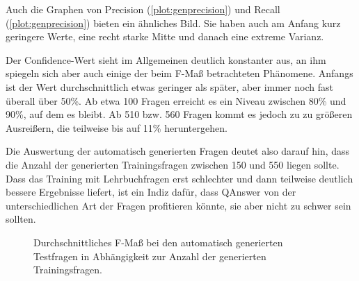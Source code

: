 Auch die Graphen von Precision (\cref{plot:genprecision}) und Recall (\cref{plot:genprecision}) bieten ein ähnliches Bild.
Sie haben auch am Anfang kurz geringere Werte, eine recht starke Mitte und danach eine extreme Varianz.

Der Confidence-Wert sieht im Allgemeinen deutlich konstanter aus, an ihm spiegeln sich aber auch einige der beim F-Maß betrachteten Phänomene.
Anfangs ist der Wert durchschnittlich etwas geringer als später, aber immer noch fast überall über 50\%.
Ab etwa 100 Fragen erreicht es ein Niveau zwischen 80\% und 90\%, auf dem es bleibt.
Ab 510 bzw. 560 Fragen kommt es jedoch zu zu größeren Ausreißern, die teilweise bis auf 11\% heruntergehen.

Die Auswertung der automatisch generierten Fragen deutet also darauf hin, dass die Anzahl der generierten Trainingsfragen zwischen 150 und 550 liegen sollte.
Dass das Training mit Lehrbuchfragen erst schlechter und dann teilweise deutlich bessere Ergebnisse liefert, ist ein Indiz dafür,
dass QAnswer von der unterschiedlichen Art der Fragen profitieren könnte, sie aber nicht zu schwer sein sollten.

\begin{figure}%
  \begin{center}
    \caption{Durchschnittliches F-Maß bei den automatisch generierten Testfragen in Abhängigkeit zur Anzahl der generierten Trainingsfragen.}\label{plot:genfscore}
  \end{center}
\end{figure}

